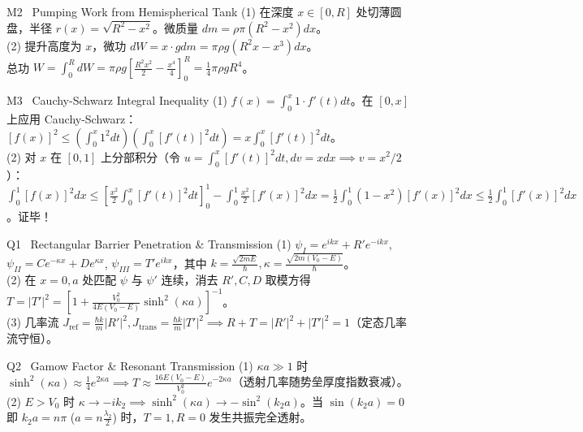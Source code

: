 \documentclass[a4paper,11pt]{article}
\begin{document}
\vspace{1.5pt}

\begin{solution}{M2 \textperiodcentered\ Pumping Work from Hemispherical Tank}
(1) 在深度 $x \in [0, R]$ 处切薄圆盘，半径 $r(x) = \sqrt{R^2 - x^2}$。微质量 $dm = \rho\pi(R^2 - x^2)dx$。\\
(2) 提升高度为 $x$，微功 $dW = x\cdot g dm = \pi\rho g (R^2 x - x^3)dx$。\\
总功 $W = \int_0^R dW = \pi\rho g \left[\frac{R^2 x^2}{2} - \frac{x^4}{4}\right]_0^R = \frac{1}{4}\pi\rho g R^4$。
\end{solution}

\vspace{1.5pt}

\begin{solution}{M3 \textperiodcentered\ Cauchy-Schwarz Integral Inequality}
(1) $f(x) = \int_0^x 1\cdot f'(t)dt$。在 $[0, x]$ 上应用 Cauchy-Schwarz：$[f(x)]^2 \le (\int_0^x 1^2 dt)(\int_0^x [f'(t)]^2 dt) = x \int_0^x [f'(t)]^2 dt$。\\
(2) 对 $x$ 在 $[0, 1]$ 上分部积分（令 $u=\int_0^x [f'(t)]^2 dt, dv=x dx \implies v=x^2/2$）：\\
$\int_0^1 [f(x)]^2 dx \le \left[\frac{x^2}{2}\int_0^x [f'(t)]^2 dt\right]_0^1 - \int_0^1 \frac{x^2}{2}[f'(x)]^2 dx = \frac{1}{2}\int_0^1 (1-x^2)[f'(x)]^2 dx \le \frac{1}{2}\int_0^1 [f'(x)]^2 dx$。证毕！
\end{solution}

\vspace{1.5pt}

\begin{solution}{Q1 \textperiodcentered\ Rectangular Barrier Penetration \& Transmission}
(1) $\psi_I = e^{ikx} + R'e^{-ikx}$, $\psi_{II} = Ce^{-\kappa x} + De^{\kappa x}$, $\psi_{III} = T'e^{ikx}$，其中 $k = \frac{\sqrt{2mE}}{\hbar}, \kappa = \frac{\sqrt{2m(V_0-E)}}{\hbar}$。\\
(2) 在 $x=0, a$ 处匹配 $\psi$ 与 $\psi'$ 连续，消去 $R', C, D$ 取模方得 $T = |T'|^2 = \left[1 + \frac{V_0^2}{4E(V_0-E)}\sinh^2(\kappa a)\right]^{-1}$。\\
(3) 几率流 $J_{\text{ref}} = \frac{\hbar k}{m}|R'|^2, J_{\text{trans}} = \frac{\hbar k}{m}|T'|^2 \implies R + T = |R'|^2 + |T'|^2 = 1$（定态几率流守恒）。
\end{solution}

\vspace{1.5pt}

\begin{solution}{Q2 \textperiodcentered\ Gamow Factor \& Resonant Transmission}
(1) $\kappa a \gg 1$ 时 $\sinh^2(\kappa a) \approx \frac{1}{4}e^{2\kappa a} \implies T \approx \frac{16E(V_0-E)}{V_0^2} e^{-2\kappa a}$（透射几率随势垒厚度指数衰减）。\\
(2) $E > V_0$ 时 $\kappa \to -ik_2 \implies \sinh^2(\kappa a) \to -\sin^2(k_2 a)$。当 $\sin(k_2 a) = 0$ 即 $k_2 a = n\pi$ ($a = n\frac{\lambda_2}{2}$) 时，$T = 1, R = 0$ 发生共振完全透射。
\end{solution}
\end{document}
